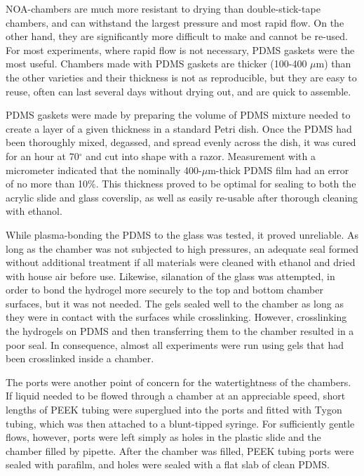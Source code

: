 NOA-chambers are much more resistant to drying than double-stick-tape chambers, and can withstand the largest pressure and most rapid flow.  On the other hand, they are significantly more difficult to make and cannot be re-used.  For most experiments, where rapid flow is not necessary, PDMS gaskets were the most useful.  Chambers made with PDMS gaskets are thicker (100-400 $\mu$m) than the other varieties and their thickness is not as reproducible, but they are easy to reuse, often can last several days without drying out, and are quick to assemble.  

PDMS gaskets were made by preparing the volume of PDMS mixture needed to create a layer of a given thickness in a standard Petri dish.  Once the PDMS had been thoroughly mixed, degassed, and spread evenly across the dish, it was cured for an hour at 70$^\circ$ and cut into shape with a razor.  Measurement with a micrometer indicated that the nominally 400-$\mu$m-thick PDMS film had an error of no more than 10\%.  This thickness proved to be optimal for sealing to both the acrylic slide and glass coverslip, as well as easily re-usable after thorough cleaning with ethanol.

While plasma-bonding the PDMS to the glass was tested, it proved unreliable.  As long as the chamber was not subjected to high pressures, an adequate seal formed without additional treatment if all materials were cleaned with ethanol and dried with house air before use. Likewise, silanation of the glass was attempted, in order to bond the hydrogel more securely to the top and bottom chamber surfaces, but it was not needed.  The gels sealed well to the chamber as long as they were in contact with the surfaces while crosslinking.  However, crosslinking the hydrogels on PDMS and then transferring them to the chamber resulted in a poor seal.  In consequence, almost all experiments were run using gels that had been crosslinked inside a chamber.

The ports were another point of concern for the watertightness of the chambers.  If liquid needed to be flowed through a chamber at an appreciable speed, short lengths of PEEK tubing were superglued into the ports and fitted with Tygon tubing, which was then attached to a blunt-tipped syringe.  For sufficiently gentle flows, however, ports were left simply as holes in the plastic slide and the chamber filled by pipette.  After the chamber was filled, PEEK tubing ports were sealed with parafilm, and holes were sealed with a flat slab of clean PDMS.

